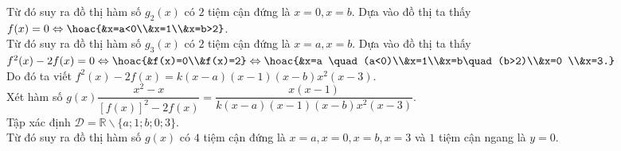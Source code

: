 \begin{ex}
{\begin{itemchoice}
Từ đó suy ra đồ thị hàm số $g_2(x)$ có $2$  tiệm cận đứng là $ x=0, x=b$.
\itemch Dựa vào đồ thị ta thấy $f(x)=0\Leftrightarrow\hoac{&x=a<0\\&x=1\\&x=b>2}$.\\
Từ đó suy ra đồ thị hàm số $g_3(x)$ có $2$  tiệm cận đứng là $ x=a, x=b$.
\itemch Dựa vào đồ thị ta thấy $f^2(x)-2f(x)=0\Leftrightarrow\hoac{&f(x)=0\\&f(x)=2}\Leftrightarrow \hoac{&x=a \quad (a<0)\\&x=1\\&x=b\quad  (b>2)\\&x=0 \\&x=3.}$\\
Do đó ta viết $f^2(x)-2f(x)=k (x-a)(x-1)(x-b)x^2(x-3)$.\\
Xét hàm số $  g(x)\dfrac{x^2-x}{\left[f(x)\right]^2-2f(x)} =\dfrac{x(x-1)}{k (x-a)(x-1)(x-b)x^2(x-3)} $.\\
Tập xác định $ \mathscr{D}=\mathbb{R}\backslash\{a;1;b;0;3\} $.\\
Từ đó suy ra đồ thị hàm số $g(x)$ có $4$  tiệm cận đứng là $ x=a,  x=0, x=b, x=3 $ và $1$ tiệm cận ngang là $y=0$.
\end{itemchoice}
}
\end{ex}

